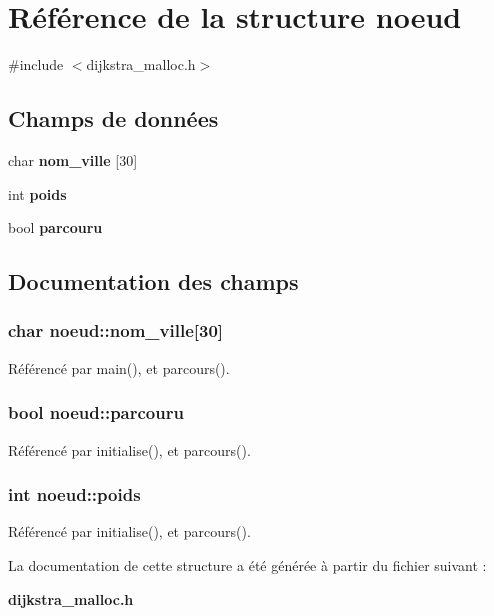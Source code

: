 \section{Référence de la structure noeud}
\label{structnoeud}


{\ttfamily \#include $<$dijkstra\+\_\+malloc.\+h$>$}

\subsection*{Champs de données}
\begin{DoxyCompactItemize}
\item 
char {\bf nom\+\_\+ville} [30]
\item 
int {\bf poids}
\item 
bool {\bf parcouru}
\end{DoxyCompactItemize}


\subsection{Documentation des champs}
\subsubsection[{nom\+\_\+ville}]{\setlength{\rightskip}{0pt plus 5cm}char noeud\+::nom\+\_\+ville[30]}\label{structnoeud_aec89e17aade6470903cbfeb50fa525cd}


Référencé par main(), et parcours().

\subsubsection[{parcouru}]{\setlength{\rightskip}{0pt plus 5cm}bool noeud\+::parcouru}\label{structnoeud_a63e747e6502ddfd2820748efda605c29}


Référencé par initialise(), et parcours().

\subsubsection[{poids}]{\setlength{\rightskip}{0pt plus 5cm}int noeud\+::poids}\label{structnoeud_a3ae968880325c2ec0c211b8aeec6b78c}


Référencé par initialise(), et parcours().



La documentation de cette structure a été générée à partir du fichier suivant \+:\begin{DoxyCompactItemize}
\item 
{\bf dijkstra\+\_\+malloc.\+h}\end{DoxyCompactItemize}

